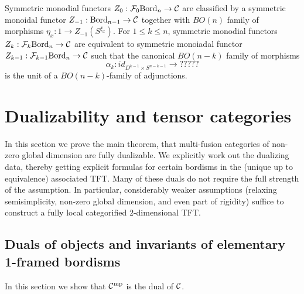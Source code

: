 \documentclass{amsart}
\begin{document}
\begin{theorem}
	Symmetric monodial functors $Z_0: \mathcal F_{0}\mathrm{Bord}_n \to \mathcal C$ are classified by a symmetric monoidal functor $Z_{-1}:\mathrm{Bord}_{n-1} \to \mathcal C$ together with $BO(n)$ family of morphisms $\eta_x: 1 \to Z_{-1}(S^{\xi_x})$. For $1 \leq k \leq n$, symmetric monodial functors $Z_k: \mathcal F_{k}\mathrm{Bord}_n \to \mathcal C$ are equivalent to symmetric monoiadal functor $Z_{k-1}: \mathcal F_{k-1}\mathrm{Bord}_n \to \mathcal C $ such that the canonical $BO(n-k)$ family of morphisms 
	\begin{equation*}
		\alpha_k: id_{D^{k-1} \times S^{n-k -1}} \to ?????
	\end{equation*}
	is the unit of a $BO(n-k)$-family of adjunctions. 
\end{theorem}


\section{Dualizability and tensor categories} \label{sec-dualfusion}

In this section we prove the main theorem, that multi-fusion categories of non-zero global dimension are fully dualizable.  We explicitly work out the dualizing data, thereby getting explicit formulas for certain bordisms in the (unique up to equivalence) associated TFT.  Many of these duals do not require the full strength of the assumption.  In particular, considerably weaker assumptions (relaxing semisimplicity, non-zero global dimension, and even part of rigidity) suffice to construct a fully local categorified $2$-dimensional TFT.

\subsection{Duals of objects and invariants of elementary 1-framed bordisms} \label{sec-df-objects}

In this section we show that $\mathcal C^{\mathrm{mp}}$ is the dual of $\mathcal C$. 
\end{document}
